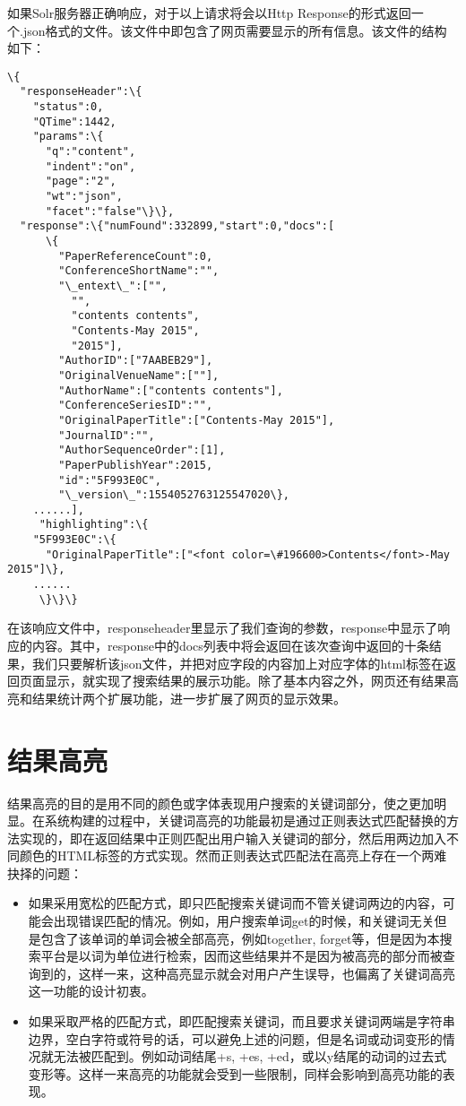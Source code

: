 如果Solr服务器正确响应，对于以上请求将会以Http Response的形式返回一个.json格式的文件。该文件中即包含了网页需要显示的所有信息。该文件的结构如下：

\begin{lstlisting}[caption={返回文件格式}, label=returnfileformat, escapeinside="", numbers=none]
\{
  "responseHeader":\{
    "status":0,
    "QTime":1442,
    "params":\{
      "q":"content",
      "indent":"on",
      "page":"2",
      "wt":"json",
      "facet":"false"\}\},
  "response":\{"numFound":332899,"start":0,"docs":[
      \{
        "PaperReferenceCount":0,
        "ConferenceShortName":"",
        "\_entext\_":["",
          "",
          "contents contents",
          "Contents-May 2015",
          "2015"],
        "AuthorID":["7AABEB29"],
        "OriginalVenueName":[""],
        "AuthorName":["contents contents"],
        "ConferenceSeriesID":"",
        "OriginalPaperTitle":["Contents-May 2015"],
        "JournalID":"",
        "AuthorSequenceOrder":[1],
        "PaperPublishYear":2015,
        "id":"5F993E0C",
        "\_version\_":1554052763125547020\},
    ......],
     "highlighting":\{
    "5F993E0C":\{
      "OriginalPaperTitle":["<font color=\#196600>Contents</font>-May 2015"]\},
    ......
     \}\}\}
\end{lstlisting}

在该响应文件中，responseheader里显示了我们查询的参数，response中显示了响应的内容。其中，response中的docs列表中将会返回在该次查询中返回的十条结果，我们只要解析该json文件，并把对应字段的内容加上对应字体的html标签在返回页面显示，就实现了搜索结果的展示功能。除了基本内容之外，网页还有结果高亮和结果统计两个扩展功能，进一步扩展了网页的显示效果。

\section{结果高亮}
结果高亮的目的是用不同的颜色或字体表现用户搜索的关键词部分，使之更加明显。在系统构建的过程中，关键词高亮的功能最初是通过正则表达式匹配替换的方法实现的，即在返回结果中正则匹配出用户输入关键词的部分，然后用两边加入不同颜色的HTML标签的方式实现。然而正则表达式匹配法在高亮上存在一个两难抉择的问题：

\begin{itemize}
\item 如果采用宽松的匹配方式，即只匹配搜索关键词而不管关键词两边的内容，可能会出现错误匹配的情况。例如，用户搜索单词get的时候，和关键词无关但是包含了该单词的单词会被全部高亮，例如together, forget等，但是因为本搜索平台是以词为单位进行检索，因而这些结果并不是因为被高亮的部分而被查询到的，这样一来，这种高亮显示就会对用户产生误导，也偏离了关键词高亮这一功能的设计初衷。
\item 如果采取严格的匹配方式，即匹配搜索关键词，而且要求关键词两端是字符串边界，空白字符或符号的话，可以避免上述的问题，但是名词或动词变形的情况就无法被匹配到。例如动词结尾+s, +es, +ed，或以y结尾的动词的过去式变形等。这样一来高亮的功能就会受到一些限制，同样会影响到高亮功能的表现。
\end{itemize}

